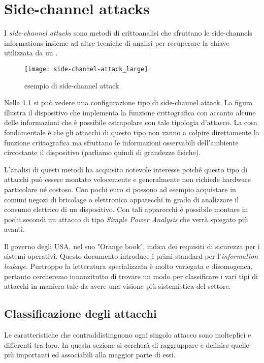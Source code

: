 \chapter{Side-channel attacks}
	I \emph{side-channel attacks} sono metodi di crittoanalisi che sfruttano le side-channels informations insieme ad altre tecniche di analisi per recuperare la chiave utilizzata da un \disps\cite{standaert2010introduction}.
	
	\begin{figure}
		\begin{center}
			\texttt{[image: side-channel-attack\_large]}
			\caption{esempio di side-channel attack}
			\label{fig:attack}
		\end{center}
	\end{figure}
	
	Nella \cref{fig:attack} si può vedere una configurazione tipo di side-channel attack. La figura illustra il dispositivo che implementa la funzione crittografica con accanto alcune delle informazioni che è possibile estrapolare con tale tipologia d'attacco. La cosa fondamentale è che gli attacchi di questo tipo non vanno a colpire direttamente la funzione crittografica ma sfruttano le informazioni osservabili dell'ambiente circostante il dispositivo (parliamo quindi di grandezze fisiche).
	
	L'analisi di questi metodi ha acquisito notevole interesse poiché questo tipo di attacchi può essere montato velocemente e generalmente non richiede hardware particolare né costoso. Con pochi euro si possono ad esempio acquistare in comuni negozi di bricolage o elettronica apparecchi in grado di analizzare il consumo elettrico di un dispositivo. Con tali apparecchi è possibile montare in pochi secondi un attacco di tipo \emph{Simple Power Analysis}\cite{mangard2002simple} che verrà spiegato più avanti. 
	
	Il governo degli USA, nel suo "Orange book"\cite{latham1986department}, indica dei requisiti di sicurezza per i sistemi operativi. Questo documento introduce i primi standard per l'\emph{information leakage}. Purtroppo la letteratura specializzata è molto variegata e disomogenea, pertanto cercheremo innanzitutto di trovare un modo per classificare i vari tipi di attacchi in maniera tale da avere una visione più sistemistica del settore.
	
	\section{Classificazione degli attacchi}	
		Le caratteristiche che contraddistinguono ogni singolo attacco sono molteplici e differenti tra loro. In questa sezione si cercherà di raggruppare e definire quelle più importanti ed associabili alla maggior parte di essi.
	
